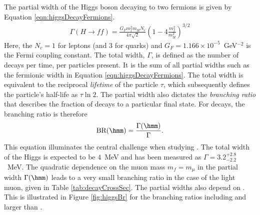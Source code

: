 The partial width of the Higgs boson decaying to two fermions is given by Equation \ref{eqn:higgsDecayFermions}.
\begin{equation}\begin{split}\label{eqn:higgsDecayFermions}
\Gamma(H\to ff)=\frac{G_Fm_f^2m_HN_c}{4\pi\sqrt{2}}(1-4\frac{m_f^2}{m_H^2})^{3/2}
\end{split}\end{equation} 
Here, the $N_c=1$ for leptons (and 3 for quarks) and $G_F=1.166\times10^{-5}$~GeV$^{-2}$ is the Fermi coupling constant.
The total width, $\Gamma$, is defined as the number of decays per time, per particles present.
It is the sum of all partial widths such as the fermionic width in Equation \ref{eqn:higgsDecayFermions}.
The total width is equivalent to the reciprocal \emph{lifetime} of the particle $\tau$, which subsequently defines the particle's half-life as $\tau\ln2$.
The partial width also dictates the \emph{branching ratio} that describes the fraction of decays to a particular final state.
For \hmm decays, the branching ratio is therefore
\begin{equation}\begin{split}
    \text{BR}(\hmm)=\frac{\Gamma(\hmm)}{\Gamma}.
\end{split}\end{equation} 
This equation illuminates the central challenge when studying \hmm. 
The total width of the Higgs is expected to be $4$~MeV and has been measured as $\Gamma=3.2^{+2.8}_{-2.2}$~MeV. \cite{cmsWidth}
The quadratic dependence on the muon mass $m_f=m_\mu$ in the partial width $\Gamma(\hmm)$ leads to a very small branching ratio in the case of the light muon, given in Table \ref{tab:decayCrossSec}.
The partial widths also depend on \mh. This is illustrated in Figure \ref{fig:higgsBr} for the branching ratios including and larger than \hmm.

